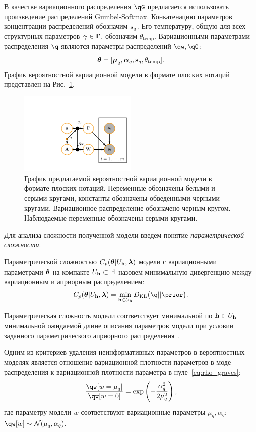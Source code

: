 В качестве вариационного распределения $\qG$ предлагается использовать произведение распределений Gumbel-Softmax. Конкатенацию параметров концентрации распределений обозначим $\mathbf{s}_q$. Его температуру, общую для всех структурных параметров $\boldsymbol{\gamma} \in \boldsymbol{\Gamma}$, обозначим $\theta_\text{temp}$.
Вариационными параметрами распределения $\q$ являются параметры распределений $\qw, \qG$:
\[\boldsymbol{\theta} =[\boldsymbol{\mu}_q, \boldsymbol{\alpha}_q,\mathbf{s}_q, \theta_\text{temp}]. 
\]
График вероятностной вариационной модели в формате плоских нотаций представлен на Рис.~\ref{fig:plate_qprob}.
\begin{figure}
\centering
   \includegraphics[width=0.5\textwidth]{plots/notebooks/plate.pdf}
\caption{График предлагаемой вероятностной вариационной модели в формате плоских нотаций. Переменные обозначены белыми и серыми кругами, константы обозначены обведенными черными кругами. Вариационное распределение обозначено черным кругом. Наблюдаемые переменные обозначены серыми кругами.}
\label{fig:plate_qprob}
\end{figure}
Для анализа сложности полученной модели введем понятие \textit{параметрической сложности}. 
\begin{defin} 
Параметрической сложностью  $C_p(\boldsymbol{\theta}|U_{\mathbf{h}}, \boldsymbol{\lambda})$ модели с вариационными параметрами $\boldsymbol{\theta}$ на компакте $U_{\mathbf{h}} \subset \mathbb{H}$ назовем минимальную дивергенцию между вариационным и априорным распределением:
\[
C_p(\teta|\Uh, \lam) = \min_{\h \in \Uh} \KL{\q}{\prior}.
\]
\end{defin}
Параметрическая сложность модели соответствует минимальной по $\mathbf{h} \in U_{\mathbf{h}}$ минимальной ожидаемой длине описания параметров модели при условии заданного параметрического априорного распределения~\cite{hinton_mdl}.

Одним из критериев удаления неинформативных параметров в вероятностных моделях является отношение вариационной плотности параметров в моде распределения к вариационной плотности параметра в нуле~\eqref{eq:rho_graves}:
\[\frac{\qw[w=\mu_q]}{\qw[w=0]}= \text{exp}\left(-\frac{\alpha_q^2}{2\mu_q^2}\right),
\]
где параметру модели $w$ соответствуют вариационные параметры $\mu_q, \alpha_q$: $\qw[w] \sim \mathcal{N}(\mu_q, \alpha_q).$

